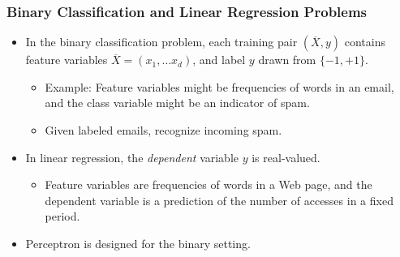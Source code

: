 \documentclass[aspectratio=169,mathserif]{beamer}
\begin{document}
\begin{frame}
\frametitle{Binary Classification and Linear Regression Problems}
\begin{itemize}
\item In the binary classification problem, each training pair $(\overline{X}, y)$ contains feature variables $\overline{X}=(x_1, \ldots x_d)$, and  label
$y$  drawn from $\{ -1, +1 \}$.
\begin{itemize}
\item Example: Feature variables might be frequencies of words in an
email, and the class variable might be an indicator of spam.
\item Given labeled emails,  recognize incoming spam.
\end{itemize}
\item In linear regression, the {\em dependent} variable $y$ is real-valued.
\begin{itemize}
\item Feature variables are frequencies of words in a Web page,
and the  dependent variable is a prediction of the number of
accesses in a fixed period.
\end{itemize}
\item Perceptron is designed for the binary setting.
\end{itemize}
\end{frame}
\end{document}

